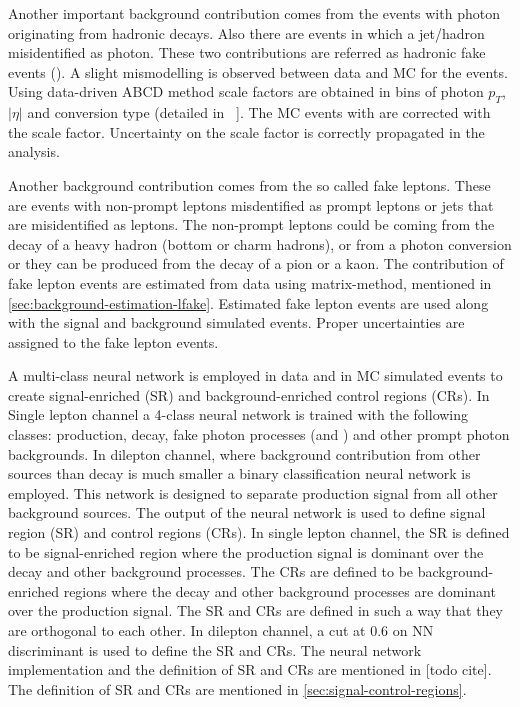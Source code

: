 Another important background contribution comes from the events with photon originating from hadronic decays. Also there are events in which a jet/hadron misidentified as photon. These two contributions are referred as hadronic fake events (\hfake). A slight mismodelling is observed between data and MC for the \hfake events. Using data-driven ABCD method scale factors are obtained in bins of photon $p_T$, $|\eta|$ and conversion type (detailed in ~\cite{DiezPardos:2781712}]. The MC events with \hfake are corrected with the scale factor. Uncertainty on the scale factor is correctly propagated in the analysis.

Another background contribution comes from the so called fake leptons. These are events with non-prompt leptons misdentified as prompt leptons or jets that are misidentified as leptons. The non-prompt leptons could be coming from the decay of a heavy hadron (bottom or charm hadrons), or from a photon conversion or they can be produced from the decay of a pion or a kaon. The contribution of fake lepton events are estimated from data using matrix-method, mentioned in \cref{sec:background-estimation-lfake}. Estimated fake lepton events are used along with the signal and background simulated events. Proper uncertainties are assigned to the fake lepton events.

A multi-class neural network is employed in data and in MC simulated events to create signal-enriched (SR) and background-enriched control regions (CRs). In Single lepton channel a 4-class neural network is trained with the following classes: \tty production, \tty decay, fake photon processes (\efake and \hfake) and other prompt photon backgrounds. In dilepton channel, where background contribution from other sources than \tty decay is much smaller a binary classification neural network is employed. This network is designed to separate \tty production signal from all other background sources. The output of the neural network is used to define signal region (SR) and control regions (CRs). In single lepton channel, the SR is defined to be signal-enriched region where the \tty production signal is dominant over the \tty decay and other background processes. The CRs are defined to be background-enriched regions where the \tty decay and other background processes are dominant over the \tty production signal. The SR and CRs are defined in such a way that they are orthogonal to each other. In dilepton channel, a cut at 0.6 on NN discriminant is used to define the SR and CRs. The neural network implementation and the definition of SR and CRs are mentioned in [todo cite].
The definition of SR and CRs are mentioned in \cref{sec:signal-control-regions}. 

